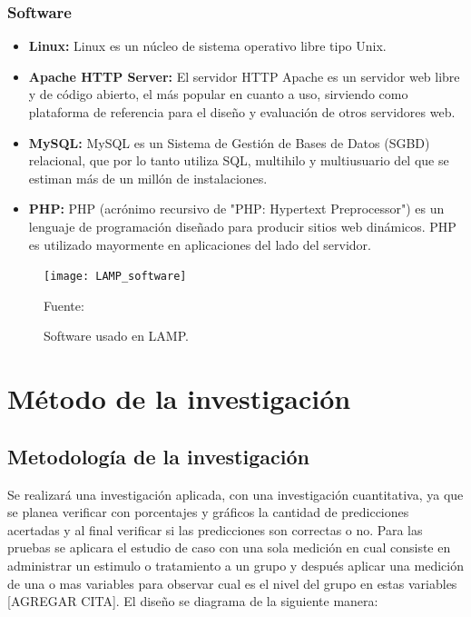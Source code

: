 \subsubsection{Software}

\begin{itemize}
	\item \textbf{Linux:} Linux es un núcleo de sistema operativo libre tipo Unix.
	\item \textbf{Apache HTTP Server:} El servidor HTTP Apache es un servidor web libre y de código abierto, el más popular en cuanto a uso, sirviendo como plataforma de referencia para el diseño y evaluación de otros servidores web.
	\item \textbf{MySQL:} MySQL es un Sistema de Gestión de Bases de Datos (SGBD) relacional, que por lo tanto utiliza SQL, multihilo y multiusuario del que se estiman más de un millón de instalaciones.
	\item \textbf{PHP:} PHP (acrónimo recursivo de "PHP: Hypertext Preprocessor") es un lenguaje de programación diseñado para producir sitios web dinámicos. PHP es utilizado mayormente en aplicaciones del lado del servidor.
\end{itemize}

\begin{figure}[ht]
	\begin{center}
		\texttt{[image: LAMP\_software]}
	\end{center}
	\begin{center}
		\vskip -0.5cm
		\caption{\small{Software usado en LAMP.}}
		{\small{Fuente: }}
	\end{center}
\end{figure}

\section{Método de la investigación}

\subsection{Metodología de la investigación}

Se realizará una investigación aplicada, con una investigación cuantitativa, ya que se planea verificar con porcentajes y gráficos la cantidad de predicciones acertadas y al final verificar si las predicciones son correctas o no.
\vskip 0.1cm 
Para las pruebas se aplicara el estudio de caso con una sola medición en cual consiste en administrar un estimulo o tratamiento a un grupo y después aplicar una medición de una o mas variables para observar cual es el nivel del grupo en estas variables [AGREGAR CITA]. El diseño se diagrama de la siguiente manera: 

